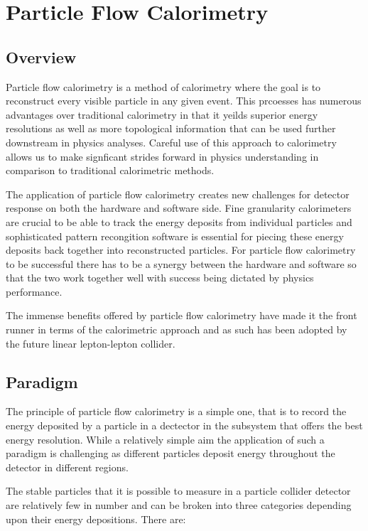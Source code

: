 \section{Particle Flow Calorimetry}
\label{sec:unitarisation}

\subsection{Overview}

Particle flow calorimetry is a method of calorimetry where the goal is to reconstruct every visible particle in any given event.  This prcoesses has numerous advantages over traditional calorimetry in that it yeilds superior energy resolutions as well as more topological information that can be used further downstream in physics analyses.  Careful use of this approach to calorimetry allows us to make signficant strides forward in physics understanding in comparison to traditional calorimetric methods.

The application of particle flow calorimetry creates new challenges for detector response on both the hardware and software side.  Fine granularity calorimeters are crucial to be able to track the energy deposits from individual particles and sophisticated pattern recongition software is essential for piecing these energy deposits back together into reconstructed particles.  For particle flow calorimetry to be successful there has to be a synergy between the hardware and software so that the two work together well with success being dictated by physics performance.  

The immense benefits offered by particle flow calorimetry have made it the front runner in terms of the calorimetric approach and as such has been adopted by the future linear lepton-lepton collider.  

\subsection{Paradigm}

The principle of particle flow calorimetry is a simple one, that is to record the energy deposited by a particle in a dectector in the subsystem that offers the best energy resolution.  While a relatively simple aim the application of such a paradigm is challenging as different particles deposit energy throughout the detector in different regions.  

The stable particles that it is possible to measure in a particle collider detector are relatively few in number and can be broken into three categories depending upon their energy depositions.  There are:

